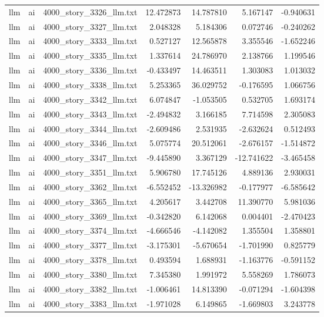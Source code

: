 \begin{longtable}{lllrrrr}
llm & ai & 4000\_story\_3326\_llm.txt & 12.472873 & 14.787810 & 5.167147 & -0.940631 \\
llm & ai & 4000\_story\_3327\_llm.txt & 2.048328 & 5.184306 & 0.072746 & -0.240262 \\
llm & ai & 4000\_story\_3333\_llm.txt & 0.527127 & 12.565878 & 3.355546 & -1.652246 \\
llm & ai & 4000\_story\_3335\_llm.txt & 1.337614 & 24.786970 & 2.138766 & 1.199546 \\
llm & ai & 4000\_story\_3336\_llm.txt & -0.433497 & 14.463511 & 1.303083 & 1.013032 \\
llm & ai & 4000\_story\_3338\_llm.txt & 5.253365 & 36.029752 & -0.176595 & 1.066756 \\
llm & ai & 4000\_story\_3342\_llm.txt & 6.074847 & -1.053505 & 0.532705 & 1.693174 \\
llm & ai & 4000\_story\_3343\_llm.txt & -2.494832 & 3.166185 & 7.714598 & 2.305083 \\
llm & ai & 4000\_story\_3344\_llm.txt & -2.609486 & 2.531935 & -2.632624 & 0.512493 \\
llm & ai & 4000\_story\_3346\_llm.txt & 5.075774 & 20.512061 & -2.676157 & -1.514872 \\
llm & ai & 4000\_story\_3347\_llm.txt & -9.445890 & 3.367129 & -12.741622 & -3.465458 \\
llm & ai & 4000\_story\_3351\_llm.txt & 5.906780 & 17.745126 & 4.889136 & 2.930031 \\
llm & ai & 4000\_story\_3362\_llm.txt & -6.552452 & -13.326982 & -0.177977 & -6.585642 \\
llm & ai & 4000\_story\_3365\_llm.txt & 4.205617 & 3.442708 & 11.390770 & 5.981036 \\
llm & ai & 4000\_story\_3369\_llm.txt & -0.342820 & 6.142068 & 0.004401 & -2.470423 \\
llm & ai & 4000\_story\_3374\_llm.txt & -4.666546 & -4.142082 & 1.355504 & 1.358801 \\
llm & ai & 4000\_story\_3377\_llm.txt & -3.175301 & -5.670654 & -1.701990 & 0.825779 \\
llm & ai & 4000\_story\_3378\_llm.txt & 0.493594 & 1.688931 & -1.163776 & -0.591152 \\
llm & ai & 4000\_story\_3380\_llm.txt & 7.345380 & 1.991972 & 5.558269 & 1.786073 \\
llm & ai & 4000\_story\_3382\_llm.txt & -1.006461 & 14.813390 & -0.071294 & -1.604398 \\
llm & ai & 4000\_story\_3383\_llm.txt & -1.971028 & 6.149865 & -1.669803 & 3.243778 \\

\end{longtable}
